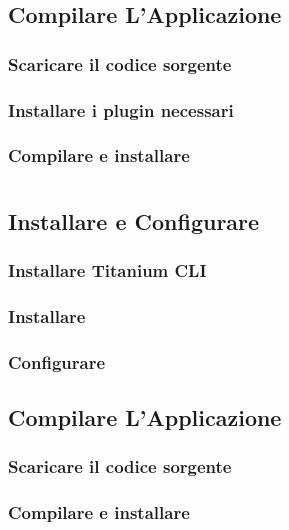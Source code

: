     \subsection{Compilare L'Applicazione}
        \subsubsection{Scaricare il codice sorgente}
        \subsubsection{Installare i plugin necessari}
        \subsubsection{Compilare e installare}


\section{\tisdk{}}

    \subsection{Installare e Configurare \tisdk{}}
        \subsubsection{Installare Titanium CLI}
        \subsubsection{Installare \tisdk{}}
        \subsubsection{Configurare \tisdk{}}
        
    \subsection{Compilare L'Applicazione}
        \subsubsection{Scaricare il codice sorgente}
        \subsubsection{Compilare e installare}
